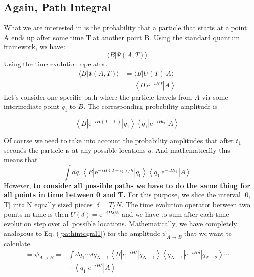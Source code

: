 \subsection{Again, Path Integral}
What we are interested in is the probability that a particle that starts at a point A ends up after some time T at another point B. Using the standard quantum framework, we have:
$$
\langle B | \Psi(A, T)\rangle
$$
Using the time evolution operator:
$$
\begin{aligned}
\langle B | \Psi(A, T)\rangle &=\langle B|U(T)| A\rangle \\
&=\left\langle B\left|\mathrm{e}^{-i H T}\right| A\right\rangle
\end{aligned}
$$
Let's consider one specific path where the particle travels from $A$ via some intermediate point $q_{1}$ to $B .$ The corresponding probability amplitude is
\begin{qt}
$$
\left\langle B\left|\mathrm{e}^{-i H\left(T-t_{1}\right)}\right| q_{1}\right\rangle\left\langle q_{1}\left|\mathrm{e}^{-i H t_{1}}\right| A\right\rangle
$$
\end{qt}
Of course we need to take into account the probability amplitudes that after $t_{1}$ seconds the particle is at any possible locations $q$. And mathematically this means that 
\begin{equation}
\int d q_{1}\left\langle B\left|\mathrm{e}^{-i H\left(T-t_{1}\right) / \hbar}\right| q_{1}\right\rangle\left\langle q_{1}\left|\mathrm{e}^{-i H t_{1}}\right| A\right\rangle
\label{pathintegral1}
\end{equation}
However, \textbf{to consider all possible paths we have to do the same thing for all points in time between 0 and T.} For this purpose, we slice the interval [0, T] into N equally sized pieces: $\delta=T / N .$ The time evolution operator between two points in time is then $U(\delta)=\mathrm{e}^{-i H \delta / \hbar}$ and we have to sum after each time evolution step over all possible locations. Mathematically, we have completely analogous to Eq. (\ref{pathintegral1}) for the amplitude $\psi_{A \rightarrow B}$ that we want to calculate
\begin{equation}
\begin{aligned}
=\psi_{A \rightarrow B}=& \int d q_{1} \cdots d q_{N-1}\left\langle B\left|e^{-i H \delta}\right| q_{N-1}\right\rangle\left\langle q_{N-1}\left|e^{-i H \delta}\right| q_{N-2}\right\rangle \cdots \\
& \cdots\left\langle q_{1}\left|e^{-i H \delta}\right| A\right\rangle
\end{aligned}
\end{equation}
